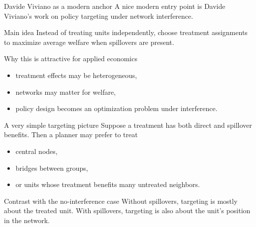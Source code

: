 \documentclass[dvipsnames,aspectratio=169,handout]{beamer}
\begin{document}
\begin{frame}{Davide Viviano as a modern anchor}
A nice modern entry point is Davide Viviano's work on policy targeting under network interference.

\begin{block}{Main idea}
Instead of treating units independently, choose treatment assignments to maximize average welfare when spillovers are present.
\end{block}

\begin{alertblock}{Why this is attractive for applied economics}
\begin{itemize}
    \item treatment effects may be heterogeneous,
    \item networks may matter for welfare,
    \item policy design becomes an optimization problem under interference.
\end{itemize}
\end{alertblock}
\end{frame}

\begin{frame}{A very simple targeting picture}
Suppose a treatment has both direct and spillover benefits.
Then a planner may prefer to treat
\begin{itemize}
    \item central nodes,
    \item bridges between groups,
    \item or units whose treatment benefits many untreated neighbors.
\end{itemize}

\begin{block}{Contrast with the no-interference case}
Without spillovers, targeting is mostly about the treated unit.
With spillovers, targeting is also about the unit's position in the network.
\end{block}
\end{frame}
\end{document}
